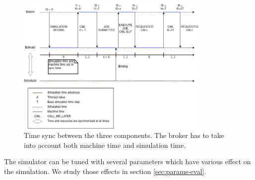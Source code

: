 \begin{figure}[]
	\centering
	\includegraphics[width=0.83\textwidth]{imgs/lignes_de_temps.png}
	\caption{Time sync between the three components. The broker has to take
	into account both machine time and simulation time.}
	\label{fig:time_sync}
\end{figure}

The simulator can be tuned with several parameters which have various effect on
the simulation. We study those effects in section \ref{sec:params-eval}.

